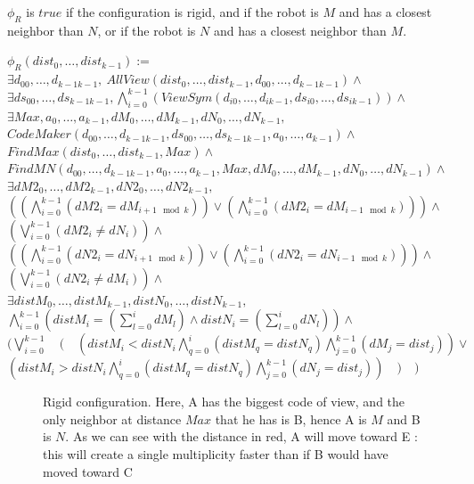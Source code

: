 \documentclass{article}
\begin{document}
$\phi_R$ is $true$ if the configuration is rigid, and if the robot is $M$ and has a closest neighbor than $N$, or if the robot is $N$ and has a closest neighbor than $M$.

\begin{center}

$\phi_R(dist_{0}, \ldots ,dist_{k-1}):=$\\
$\exists d_{00}, \ldots ,d_{k-1k-1},\ AllView(dist_{0}, \ldots ,dist_{k-1}, d_{00}, \ldots ,d_{k-1k-1})\land$\\
$\exists ds_{00}, \ldots ,ds_{k-1k-1}, \bigwedge_{i=0}^{k-1} (ViewSym(d_{i0}, \ldots , d_{ik-1}, ds_{i0}, \ldots , ds_{ik-1}))\land$\\
$\exists Max, a_{0}, \ldots , a_{k-1}, dM_{0}, \dots, dM_{k-1}, dN_{0}, \dots, dN_{k-1},$\\
$CodeMaker(d_{00}, \ldots ,d_{k-1k-1}, ds_{00}, \ldots ,ds_{k-1k-1}, a_{0}, \ldots , a_{k-1})\land$\\
$FindMax(dist_{0}, \ldots ,dist_{k-1}, Max) \land$\\
$FindMN(d_{00}, \ldots ,d_{k-1k-1}, a_{0}, \ldots , a_{k-1}, Max,  dM_{0}, \dots, dM_{k-1}, dN_{0}, \dots, dN_{k-1}) \land $\\
$\exists dM2_{0}, \dots, dM2_{k-1}, dN2_{0}, \dots, dN2_{k-1},$\\
$( (\bigwedge_{i = 0}^{k-1} (dM2_{i} = dM_{i+1 \mod{k}}) ) \lor (\bigwedge_{i = 0}^{k-1} (dM2_{i} = dM_{i-1 \mod{k}})) ) \land$\\
$(\bigvee_{i = 0}^{k-1} (dM2_{i} \not= dN_{i}) ) \land $\\
$( (\bigwedge_{i = 0}^{k-1} (dN2_{i} = dN_{i+1 \mod{k}}) ) \lor (\bigwedge_{i = 0}^{k-1} (dN2_{i} = dN_{i-1 \mod{k}})) ) \land$\\
$(\bigvee_{i = 0}^{k-1} (dN2_{i} \not= dM_{i}) ) \land $\\

$\exists distM_{0}, \ldots , distM_{k-1}, distN_{0}, \ldots , distN_{k-1},$\\
$\bigwedge_{i=0}^{k-1}(distM_{i} = (\sum_{l=0}^i dM_{l}) \land distN_{i} = (\sum_{l=0}^i dN_{l}) ) \land $\\
$(\bigvee_{i=0}^{k-1}\quad (\quad (distM_{i} < distN_{i} \bigwedge_{q=0}^{i} (distM_{q} = distN_{q}) \bigwedge_{j = 0}^{k-1} (dM_{j} = dist_{j}) ) \lor $\\
$(distM_{i} > distN_{i} \bigwedge_{q=0}^{i} (distM_{q} = distN_{q}) \bigwedge_{j = 0}^{k-1} (dN_{j} = dist_{j}) )\quad )\quad )$
\end{center}
\newpage
\begin{figure}[!hp]
    \centering
    \def\svgscale{0.3}
    
    \caption{Rigid configuration. Here, A has the biggest code of view, and the only neighbor at distance $Max$ that he has is B, hence A is $M$ and B is $N$. As we can see with the distance in red, A will move toward E : this will create a single multiplicity faster than if B would have moved toward C}
    \label{dessinRigid}
\end{figure}
\end{document}
